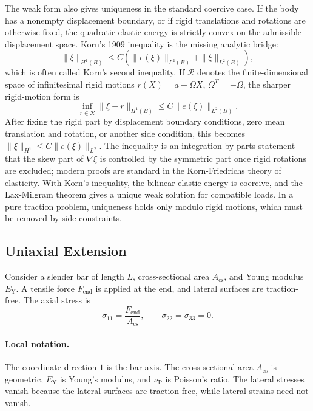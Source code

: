 The weak form also gives uniqueness in the standard coercive case. If the body
has a nonempty displacement boundary, or if rigid translations and rotations
are otherwise fixed, the quadratic elastic energy is strictly convex on the
admissible displacement space. Korn's 1909 inequality is the missing analytic
bridge:
\[
  \|\xi\|_{H^1(B)}
  \le C\left(\|e(\xi)\|_{L^2(B)}+\|\xi\|_{L^2(B)}\right),
\]
which is often called Korn's second inequality. If \(\mathcal R\) denotes the
finite-dimensional space of infinitesimal rigid motions
\(r(X)=a+\Omega X\), \(\Omega^T=-\Omega\), the sharper rigid-motion form is
\[
  \inf_{r\in\mathcal R}\|\xi-r\|_{H^1(B)}
  \le C\|e(\xi)\|_{L^2(B)}.
\]
After fixing the rigid part by displacement boundary conditions, zero mean
translation and rotation, or another side condition, this becomes
\(\|\xi\|_{H^1}\le C\|e(\xi)\|_{L^2}\). The inequality is an
integration-by-parts statement that the skew part of \(\nabla\xi\) is controlled
by the symmetric part once rigid rotations are excluded; modern proofs are
standard in the Korn-Friedrichs theory of elasticity. With Korn's inequality,
the bilinear elastic energy is coercive, and the Lax-Milgram theorem gives a
unique weak solution for compatible loads. In a pure traction problem,
uniqueness holds only modulo rigid motions, which must be removed by side
constraints.

\subsection{Uniaxial Extension}
\label{subsec:uniaxial-extension}

Consider a slender bar of length \(L\), cross-sectional area \(A_{\mathrm{cs}}\),
and Young modulus \(E_{\mathrm Y}\). A tensile force \(F_{\mathrm{end}}\) is
applied at the end, and lateral surfaces are traction-free. The axial stress is
\[
  \sigma_{11}=\frac{F_{\mathrm{end}}}{A_{\mathrm{cs}}},
  \qquad
  \sigma_{22}=\sigma_{33}=0.
\]

\paragraph{Local notation.}
The coordinate direction \(1\) is the bar axis.  The cross-sectional area
\(A_{\mathrm{cs}}\) is geometric, \(E_{\mathrm Y}\) is Young's modulus, and
\(\nu_{\mathrm P}\) is Poisson's ratio.  The lateral stresses vanish because
the lateral surfaces are traction-free, while lateral strains need not vanish.

